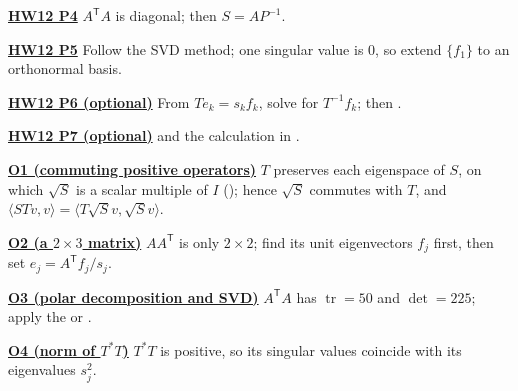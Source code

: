 \documentclass[10pt]{scrartcl}
\DeclareMathOperator{\tr}{tr}\DeclareMathOperator{\nul}{null}\DeclareMathOperator{\range}{range}\DeclareMathOperator{\spn}{span}
\begin{document}
\par\medskip\noindent\textbf{\hyperlink{prob-HW12-P4}{HW12 P4}} $A^{\mathsf T}A$ is diagonal; then $S=AP^{-1}$.

\par\medskip\noindent\textbf{\hyperlink{prob-HW12-P5}{HW12 P5}} Follow the SVD method; one singular value is $0$, so extend $\{f_1\}$ to an orthonormal basis.

\par\medskip\noindent\textbf{\hyperlink{prob-HW12-P6}{HW12 P6 (optional)}} From $Te_k=s_kf_k$, solve for $T^{-1}f_k$; then .

\par\medskip\noindent\textbf{\hyperlink{prob-HW12-P7}{HW12 P7 (optional)}}  and the calculation in .

\par\medskip\noindent\textbf{\hyperlink{prob-O1}{O1 (commuting positive operators)}} $T$ preserves each eigenspace of $S$, on which $\sqrt{S}$ is a scalar multiple of $I$ (); hence $\sqrt{S}$ commutes with $T$, and $\langle STv,v\rangle=\langle T\sqrt{S}v,\sqrt{S}v\rangle$.

\par\medskip\noindent\textbf{\hyperlink{prob-O2}{O2 (a $2\times3$ matrix)}} $AA^{\mathsf T}$ is only $2\times2$; find its unit eigenvectors $f_j$ first, then set $e_j=A^{\mathsf T}f_j/s_j$.

\par\medskip\noindent\textbf{\hyperlink{prob-O3}{O3 (polar decomposition and SVD)}} $A^{\mathsf T}A$ has $\tr=50$ and $\det=225$; apply the  or .

\par\medskip\noindent\textbf{\hyperlink{prob-O4}{O4 (norm of $T^*T$)}} $T^*T$ is positive, so its singular values coincide with its eigenvalues $s_j^2$.
\end{document}

